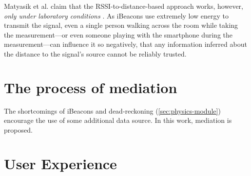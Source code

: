 Matyasik et al. claim that the RSSI-to-distance-based approach works, however, \emph{only under laboratory conditions} \cite{Matyasik:iBeacon, Matyasik:iBeacon:slides}. As iBeacons use extremely low energy to transmit the signal, even a single person walking across the room while taking the measurement---or even someone playing with the smartphone during the measurement---can influence it so negatively, that any information inferred about the distance to the signal's source cannot be reliably trusted.

\section{The process of mediation}

The shortcomings of iBeacons and dead-reckoning (\cref{sec:physics-module}) encourage the use of some additional data source. In this work, mediation is proposed.


\section{User Experience}
\label{sec:user-experience}
